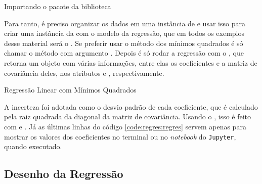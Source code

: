     \begin{listing}[H]
        \caption{Importando o pacote  da biblioteca \scipy}
        \label{code:regres:odr}

    \end{listing}

    Para tanto, é preciso organizar os dados em uma instância de  e usar isso para criar uma instância da  com o modelo da regressão, que em todos os exemplos desse material será o . Se preferir usar o método dos mínimos quadrados é só chamar o método  com argumento . Depois é só rodar a regressão com o , que retorna um objeto  com várias informações, entre elas os coeficientes e a matriz de covariância deles, nos atributos  e , respectivamente.

    \begin{listing}[H]
        \caption{Regressão Linear com Mínimos Quadrados}
        \label{code:regres:regres}

    \end{listing}

    A incerteza foi adotada como o desvio padrão de cada coeficiente, que é calculado pela raiz quadrada da diagonal da matriz de covariância. Usando o \numpy, isso é feito com  e . Já as últimas linhas do código \ref{code:regres:regres} servem apenas para mostrar os valores dos coeficientes no terminal ou no \textit{notebook} do \texttt{Jupyter}, quando executado.


\subsection{Desenho da Regressão}

